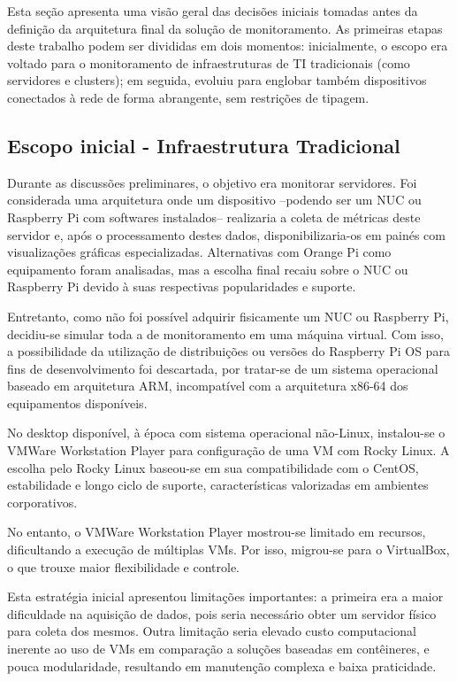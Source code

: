 {Esta seção apresenta uma visão geral das decisões iniciais tomadas antes da definição da arquitetura final da solução de monitoramento. As primeiras etapas deste trabalho podem ser divididas em dois momentos: inicialmente, o escopo era voltado para o monitoramento de infraestruturas de TI tradicionais (como servidores e clusters); em seguida, evoluiu para englobar também dispositivos conectados à rede de forma abrangente, sem restrições de tipagem.

\subsection{Escopo inicial - Infraestrutura Tradicional}
\label{subsection:EscopoInicial}

Durante as discussões preliminares, o objetivo era monitorar servidores. Foi considerada uma arquitetura onde um dispositivo --podendo ser um NUC ou Raspberry Pi com softwares instalados-- realizaria a coleta de métricas deste servidor e, após o processamento destes dados, disponibilizaria-os em painés com visualizações gráficas especializadas. Alternativas com Orange Pi como equipamento foram analisadas, mas a escolha final recaiu sobre o NUC ou Raspberry Pi devido à suas respectivas popularidades e suporte.

Entretanto, como não foi possível adquirir fisicamente um NUC ou Raspberry Pi, decidiu-se simular toda a  de monitoramento em uma máquina virtual. Com isso, a possibilidade da utilização de distribuições ou versões do Raspberry Pi OS para fins de desenvolvimento foi descartada, por tratar-se de um sistema operacional baseado em arquitetura ARM, incompatível com a arquitetura x86-64 dos equipamentos disponíveis.

No desktop disponível, à época com sistema operacional não-Linux, instalou-se o VMWare Workstation Player para configuração de uma VM com Rocky Linux. A escolha pelo Rocky Linux baseou-se em sua compatibilidade com o CentOS, estabilidade e longo ciclo de suporte, características valorizadas em ambientes corporativos.

No entanto, o VMWare Workstation Player mostrou-se limitado em recursos, dificultando a execução de múltiplas VMs. Por isso, migrou-se para o VirtualBox, o que trouxe maior flexibilidade e controle.

Esta estratégia inicial apresentou limitações importantes: a primeira era a maior dificuldade na aquisição de dados, pois seria necessário obter um servidor físico para coleta dos mesmos. Outra limitação seria elevado custo computacional inerente ao uso de VMs em comparação a soluções baseadas em contêineres, e pouca modularidade, resultando em manutenção complexa e baixa praticidade.

}

